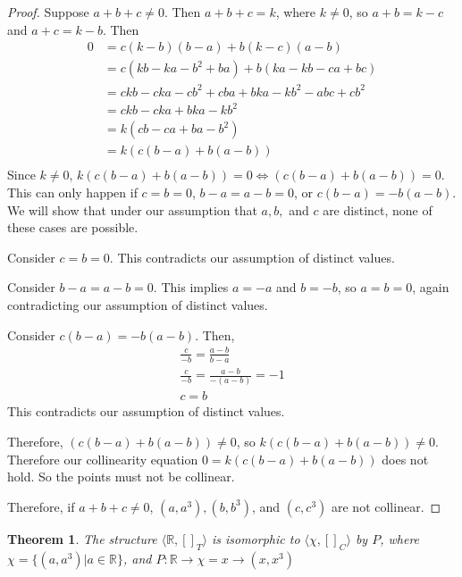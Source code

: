 \documentclass[11pt]{article}
\newtheorem{thm}{Theorem}
\begin{document}
\begin{proof}
    Suppose $a+b+c \neq 0$. Then $a+b+c = k$, where $k \neq 0$, so $a+b = k - c$ and $a + c = k - b$. Then \begin{align*}
        0 &= c(k-b)(b-a) + b(k-c)(a-b) \\ 
        &= c(kb - ka - b^2 + ba) + b(ka - kb - ca + bc) \\ 
        &= ckb - cka - cb^2 + cba + bka - kb^2 - abc + cb^2 \\ 
        &= ckb - cka + bka - kb^2  \\ 
        &= k(cb - ca + ba - b^2) \\ 
        &= k(c(b - a) + b(a - b)) \\ 
    \end{align*}
    Since $k \neq 0$, $k(c(b - a) + b(a-b)) = 0 \iff (c(b-a) + b(a-b)) = 0$. This can only happen if $c = b = 0$, $b-a = a-b = 0$, or $c(b-a) = -b(a-b)$. We will show that under our assumption that $a, b,$ and $c$ are distinct, none of these cases are possible. 

    Consider $c = b = 0$. This contradicts our assumption of distinct values. 

    Consider $b - a = a-b = 0$. This implies $a = -a$ and $b = -b$, so $a = b = 0$, again contradicting our assumption of distinct values. 

    Consider $c(b-a) = -b(a-b)$. Then, \begin{gather*}
        \frac{c}{-b} = \frac{a-b}{b-a} \\ 
        \frac{c}{-b} = \frac{a-b}{-(a-b)} = -1 \\ 
        c = b
    \end{gather*}
    This contradicts our assumption of distinct values. 

    Therefore, $(c(b-a) + b(a-b)) \neq 0$, so $k(c(b-a) + b(a-b)) \neq 0$. Therefore our collinearity equation $0 = k(c(b-a) + b(a-b))$ does not hold. So the points must not be collinear.

    Therefore, if $a+b+c \neq 0$, $(a, a^3), (b, b^3)$, and $(c, c^3)$ are not collinear.
\end{proof}

\begin{thm}
    \label{thm:iso}
    The structure $\langle \mathbb{R}, []_T \rangle$ is isomorphic to $\langle \chi , []_{C} \rangle$ by $P$, where $\chi = \{(a, a^3) | a \in \mathbb{R}\}$, and $P: \mathbb{R} \to \chi = x \to (x, x^3)$
\end{thm}
\end{document}
